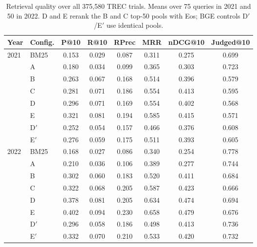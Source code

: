 \documentclass{article}
\begin{document}
\begin{table}[t]
  \caption{Retrieval quality over all 375{,}580 TREC trials. Means over 75 queries in 2021 and 50 in 2022. D and E rerank the B and C top-50 pools with Eos; BGE controls D$\prime$/E$\prime$ use identical pools.}
  \label{tab:results-exp1}
  \centering
  \small
  \begin{tabular}{llcccccc}
    \toprule
    Year & Config. & P@10 & R@10 & RPrec & MRR & nDCG@10 & Judged@10 \\
    \midrule
    2021 & BM25 & 0.153 & 0.029 & 0.087 & 0.311 & 0.275 & 0.699 \\
     & A & 0.180 & 0.034 & 0.099 & 0.365 & 0.303 & 0.723 \\
     & B & 0.263 & 0.067 & 0.168 & 0.514 & 0.396 & 0.579 \\
     & C & 0.281 & 0.071 & 0.186 & 0.554 & 0.413 & 0.595 \\
     & D & 0.296 & 0.071 & 0.169 & 0.554 & 0.402 & 0.568 \\
     & E & 0.321 & 0.081 & 0.194 & 0.585 & 0.415 & 0.571 \\
     & D$'$ & 0.252 & 0.054 & 0.157 & 0.466 & 0.376 & 0.608 \\
     & E$'$ & 0.276 & 0.059 & 0.175 & 0.511 & 0.393 & 0.605 \\
    \midrule
    2022 & BM25 & 0.168 & 0.027 & 0.086 & 0.340 & 0.254 & 0.778 \\
     & A & 0.210 & 0.036 & 0.106 & 0.389 & 0.277 & 0.744 \\
     & B & 0.302 & 0.060 & 0.183 & 0.520 & 0.411 & 0.684 \\
     & C & 0.322 & 0.068 & 0.205 & 0.587 & 0.423 & 0.666 \\
     & D & 0.378 & 0.081 & 0.205 & 0.634 & 0.474 & 0.694 \\
     & E & 0.402 & 0.094 & 0.230 & 0.658 & 0.479 & 0.676 \\
     & D$'$ & 0.296 & 0.058 & 0.186 & 0.498 & 0.413 & 0.736 \\
     & E$'$ & 0.332 & 0.070 & 0.210 & 0.533 & 0.420 & 0.732 \\
    \bottomrule
  \end{tabular}
\end{table}
\end{document}
